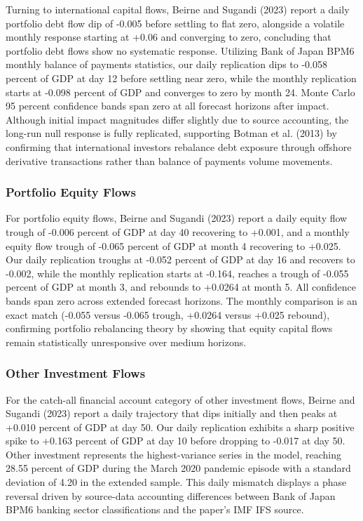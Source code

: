 Turning to international capital flows, Beirne and Sugandi (2023) report a daily portfolio debt flow dip of -0.005 before settling to flat zero, alongside a volatile monthly response starting at +0.06 and converging to zero, concluding that portfolio debt flows show no systematic response. Utilizing Bank of Japan BPM6 monthly balance of payments statistics, our daily replication dips to -0.058 percent of GDP at day 12 before settling near zero, while the monthly replication starts at -0.098 percent of GDP and converges to zero by month 24. Monte Carlo 95 percent confidence bands span zero at all forecast horizons after impact. Although initial impact magnitudes differ slightly due to source accounting, the long-run null response is fully replicated, supporting Botman et al. (2013) by confirming that international investors rebalance debt exposure through offshore derivative transactions rather than balance of payments volume movements.

\subsubsection{Portfolio Equity Flows}

For portfolio equity flows, Beirne and Sugandi (2023) report a daily equity flow trough of -0.006 percent of GDP at day 40 recovering to +0.001, and a monthly equity flow trough of -0.065 percent of GDP at month 4 recovering to +0.025. Our daily replication troughs at -0.052 percent of GDP at day 16 and recovers to -0.002, while the monthly replication starts at -0.164, reaches a trough of -0.055 percent of GDP at month 3, and rebounds to +0.0264 at month 5. All confidence bands span zero across extended forecast horizons. The monthly comparison is an exact match (-0.055 versus -0.065 trough, +0.0264 versus +0.025 rebound), confirming portfolio rebalancing theory \parencite{hau_rey_2006} by showing that equity capital flows remain statistically unresponsive over medium horizons.

\subsubsection{Other Investment Flows}

For the catch-all financial account category of other investment flows, Beirne and Sugandi (2023) report a daily trajectory that dips initially and then peaks at +0.010 percent of GDP at day 50. Our daily replication exhibits a sharp positive spike to +0.163 percent of GDP at day 10 before dropping to -0.017 at day 50. Other investment represents the highest-variance series in the model, reaching 28.55 percent of GDP during the March 2020 pandemic episode with a standard deviation of 4.20 in the extended sample. This daily mismatch displays a phase reversal driven by source-data accounting differences between Bank of Japan BPM6 banking sector classifications and the paper's IMF IFS source.

